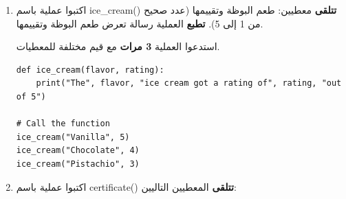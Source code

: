 \documentclass[14pt]{extarticle}
\begin{document}
\begin{enumerate}[resume, label=\textbf{تمرين \arabic*:}, wide=0pt, itemsep=2.2em]
\begin{itemize}[itemsep=0.3em]
\item \textenglish{juice\_bottle}: عدد قناني العصير.
\item \textenglish{bottle\_price}: سعر القنينة الواحدة.
\item \textenglish{discount}: التخفيض. (افترضوا أنّ التخفيض نسبة مئوية، مثلًا \textenglish{20} تعني \textenglish{20\%}.)
\end{itemize}

تحسب العملية و\textbf{تطبع} السعر الذي يجب دفعه لشراء قناني العصير \textbf{قبل} التخفيض و\textbf{بعده}، مع رسالة ملائمة لكل سعر.

\ifwithsols
\begin{boxSolution}
\begin{english}
\begin{verbatim}
def super_market(juice_bottle, bottle_price, discount):
    price_before = juice_bottle * bottle_price
    price_after = price_before - price_before * discount / 100
    print("Price before discount:", price_before)
    print("Price after discount:", price_after)

# Call the function
super_market(10, 5, 20)
\end{verbatim}
\end{english}
\end{boxSolution}

\filbreak
\fi

\item اكتبوا عملية باسم \textenglish{ice\_cream()} \textbf{تتلقى} معطيين: طعم البوظة وتقييمها (عدد صحيح من 1 إلى 5). \textbf{تطبع} العملية رسالة تعرض طعم البوظة وتقييمها.

استدعوا العملية \textbf{3 مرات} مع قيم مختلفة للمعطيات.

\ifwithsols
\begin{boxSolution}
\begin{english}
\begin{verbatim}
def ice_cream(flavor, rating):
    print("The", flavor, "ice cream got a rating of", rating, "out of 5")

# Call the function
ice_cream("Vanilla", 5)
ice_cream("Chocolate", 4)
ice_cream("Pistachio", 3)
\end{verbatim}
\end{english}
\end{boxSolution}

\fi

\filbreak
\item اكتبوا عملية باسم \textenglish{certificate()} \textbf{تتلقى} المعطيين التاليين:


\end{enumerate}
\end{document}
